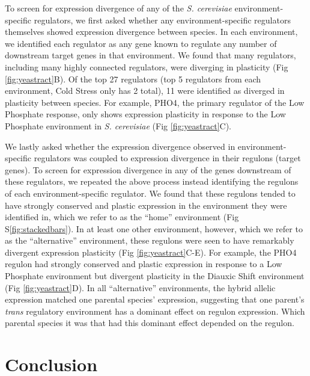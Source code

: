 To screen for expression divergence of any of the \textit{S. cerevisiae} environment-specific regulators, we first asked whether any environment-specific regulators themselves showed expression divergence between species. In each environment, we identified each regulator as any gene known to regulate any number of downstream target genes in that environment. We found that many regulators, including many highly connected regulators, were diverging in plasticity (Fig \ref{fig:yeastract}B). Of the top 27 regulators (top 5 regulators from each environment, Cold Stress only has 2 total), 11 were identified as diverged in plasticity between species. For example, PHO4, the primary regulator of the Low Phosphate response, only shows expression plasticity in response to the Low Phosphate environment in \textit{S. cerevisiae} (Fig \ref{fig:yeastract}C).

We lastly asked whether the expression divergence observed in environment-specific regulators was coupled to expression divergence in their regulons (target genes). To screen for expression divergence in any of the genes downstream of these regulators, we repeated the above process instead identifying the regulons of each environment-specific regulator. We found that these regulons tended to have strongly conserved and plastic expression in the environment they were identified in, which we refer to as the “home” environment (Fig S\ref{fig:stackedbars}). In at least one other environment, however, which we refer to as the “alternative” environment, these regulons were seen to have remarkably divergent expression plasticity (Fig \ref{fig:yeastract}C-E). For example, the PHO4 regulon had strongly conserved and plastic expression in response to a Low Phosphate environment but divergent plasticity in the Diauxic Shift environment (Fig \ref{fig:yeastract}D). In all ``alternative” environments, the hybrid allelic expression matched one parental species’ expression, suggesting that one parent’s \textit{trans} regulatory environment has a dominant effect on regulon expression. Which parental species it was that had this dominant effect depended on the regulon.

\section{Conclusion}

